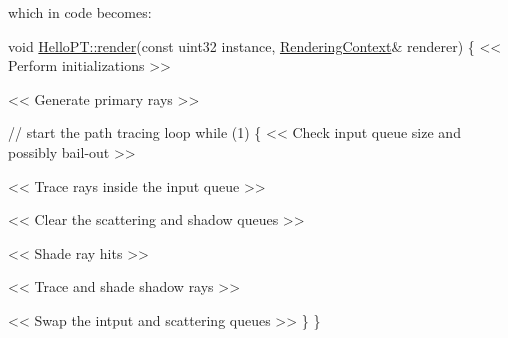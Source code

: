 \begin{DoxyParagraph}{}
which in code becomes\+: ~\newline

\begin{DoxyCode}
\textcolor{keywordtype}{void} \hyperlink{struct_hello_p_t_af772aac0d80118742450fd8b6b3c58c2}{HelloPT::render}(\textcolor{keyword}{const} uint32 instance, \hyperlink{struct_rendering_context}{RenderingContext}& renderer)
\{
    << Perform initializations >>

    << Generate primary rays >>

    \textcolor{comment}{// start the path tracing loop}
    \textcolor{keywordflow}{while} (1)
    \{
        << Check input queue size and possibly bail-out >>

        << Trace rays inside the input queue >>  

        << Clear the scattering and shadow queues >>

        << Shade ray hits >>

        << Trace and shade shadow rays >>

        << Swap the intput and scattering queues >>
    \}
\}
\end{DoxyCode}

\end{DoxyParagraph}
